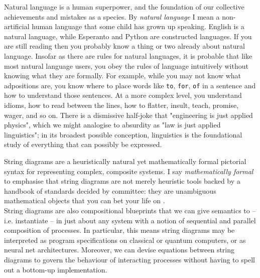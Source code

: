 Natural language is a human superpower, and the foundation of our collective achievements and mistakes as a species. By \emph{natural language} I mean a non-artificial human language that some child has grown up speaking. English is a natural language, while Esperanto and Python are constructed languages. If you are still reading then you probably know a thing or two already about natural language. Insofar as there are rules for natural languages, it is probable that like most natural language users, you obey the rules of language intuitively without knowing what they are formally. For example, while you may not know what adpositions are, you know where to place words like \texttt{to}, \texttt{for}, \texttt{of} in a sentence and how to understand those sentences. At a more complex level, you understand idioms, how to read between the lines, how to flatter, insult, teach, promise, wager, and so on. There is a dismissive half-joke that "engineering is just applied physics", which we might analogise to absurdity as "law is just applied linguistics"; in its broadest possible conception, linguistics is the foundational study of everything that can possibly be expressed.


String diagrams are a heuristically natural yet mathematically formal pictorial syntax for representing complex, composite systems. I say \emph{mathematically formal} to emphasise that string diagrams are not merely heuristic tools backed by a handbook of standards decided by committee: they are unambiguous mathematical objects that you can bet your life on \citep{joyal_geometry_1991,joyal_geometry_nodate,maclane_natural_1963,lane_categories_2010,selinger_survey_2010}.\\

String diagrams are also compositional blueprints that we can give semantics to -- i.e. instantiate -- in just about any system with a notion of sequential and parallel composition of processes. In particular, this means string diagrams may be interpreted as program specifications on classical or quantum computers, or as neural net architectures. Moreover, we can devise equations between string diagrams to govern the behaviour of interacting processes without having to spell out a bottom-up implementation.\\

